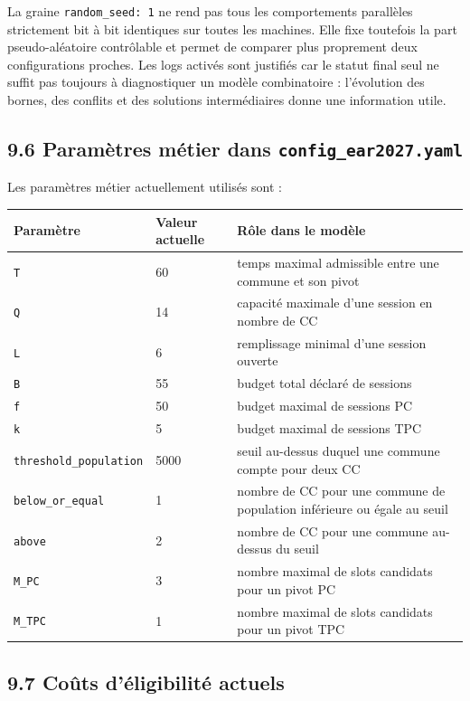 \documentclass[11pt,a4paper]{article}
\begin{document}
La graine \texttt{random\_seed: 1} ne rend pas tous les comportements parallèles strictement bit à bit identiques sur toutes les machines. Elle fixe toutefois la part pseudo-aléatoire contrôlable et permet de comparer plus proprement deux configurations proches. Les logs activés sont justifiés car le statut final seul ne suffit pas toujours à diagnostiquer un modèle combinatoire : l'évolution des bornes, des conflits et des solutions intermédiaires donne une information utile.

\subsection{9.6 Paramètres métier dans \texttt{config\_ear2027.yaml}}

Les paramètres métier actuellement utilisés sont :

\begin{longtable}{|L{0.26\textwidth}|L{0.16\textwidth}|L{0.48\textwidth}|}
\hline
Paramètre & Valeur actuelle & Rôle dans le modèle \\
\hline
\endhead
\texttt{T} & 60 & temps maximal admissible entre une commune et son pivot \\
\hline
\texttt{Q} & 14 & capacité maximale d'une session en nombre de CC \\
\hline
\texttt{L} & 6 & remplissage minimal d'une session ouverte \\
\hline
\texttt{B} & 55 & budget total déclaré de sessions \\
\hline
\texttt{f} & 50 & budget maximal de sessions PC \\
\hline
\texttt{k} & 5 & budget maximal de sessions TPC \\
\hline
\texttt{threshold\_population} & 5000 & seuil au-dessus duquel une commune compte pour deux CC \\
\hline
\texttt{below\_or\_equal} & 1 & nombre de CC pour une commune de population inférieure ou égale au seuil \\
\hline
\texttt{above} & 2 & nombre de CC pour une commune au-dessus du seuil \\
\hline
\texttt{M\_PC} & 3 & nombre maximal de slots candidats pour un pivot PC \\
\hline
\texttt{M\_TPC} & 1 & nombre maximal de slots candidats pour un pivot TPC \\
\hline
\end{longtable}

\subsection{9.7 Coûts d'éligibilité actuels}
\end{document}
